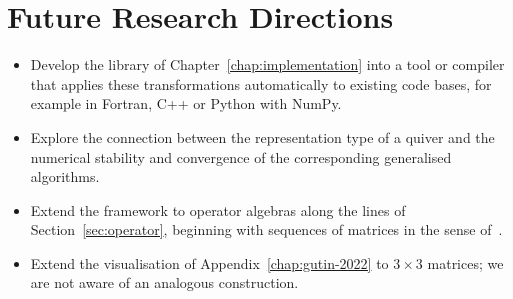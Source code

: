 \documentclass[12pt, a4paper]{report}
\theoremstyle{plain}
\theoremstyle{definition}
\theoremstyle{remark}
\theoremstyle{plain}
\begin{document}
\section{Future Research Directions}
\label{sec:future}
\begin{itemize}
    \item Develop the library of Chapter~\ref{chap:implementation} into a tool or compiler that applies these transformations automatically to existing code bases, for example in Fortran, C++ or Python with NumPy.
    \item Explore the connection between the representation type of a quiver and the numerical stability and convergence of the corresponding generalised algorithms.
    \item Extend the framework to operator algebras along the lines of Section~\ref{sec:operator}, beginning with sequences of matrices in the sense of~\cite{HagenRochSilbermann2001}.
    \item Extend the visualisation of Appendix~\ref{chap:gutin-2022} to $3\times3$ matrices; we are not aware of an analogous construction.
\end{itemize}
\end{document}
